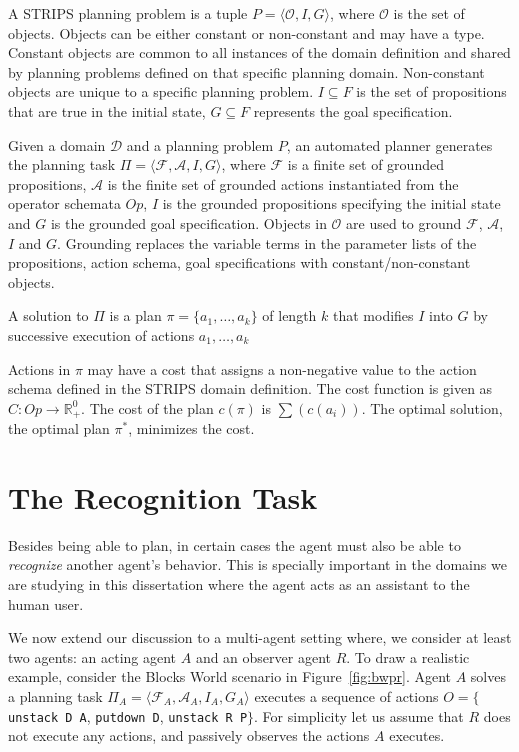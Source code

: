 \begin{definition}
A STRIPS planning problem is a tuple $P = \langle \mathcal{O}, I, G\rangle$, where $\mathcal{O}$ is the set of objects. Objects can be either constant or non-constant and may have a type. Constant objects are common to all instances of the domain definition and shared by planning problems defined on that specific planning domain. Non-constant objects are unique to a specific planning problem. $I \subseteq F$ is the set of propositions that are true in the initial state, $G\subseteq F$ represents the goal specification.
\end{definition}

Given a domain $\mathcal{D}$ and a planning problem $P$, an automated planner generates the planning task $\Pi=\langle \mathcal{F}, \mathcal{A}, I, G\rangle$, where $\mathcal{F}$ is a finite set of grounded propositions, $\mathcal{A}$ is the finite set of grounded actions instantiated from the operator schemata $Op$, $I$ is the grounded propositions specifying the initial state and $G$ is the grounded goal specification. Objects in $\mathcal{O}$ are used to ground $\mathcal{F}$, $\mathcal{A}$, $I$ and $G$. Grounding replaces the variable terms in the parameter lists of the propositions, action schema, goal specifications with constant/non-constant objects. 

\begin{definition}
A solution to $\Pi$ is a plan $\pi=\lbrace a_1, \ldots, a_k\rbrace$ of length $k$ that modifies $I$ into $G$ by successive execution of actions  $a_1, \ldots, a_k$ 
\end{definition}

Actions in $\pi$ may have a cost that assigns a non-negative value to the action schema defined in the STRIPS domain definition. The cost function is given as $C: Op \rightarrow \mathbb{R}^0_+$. The cost of the plan $c(\pi)$ is  $\sum(c(a_i))$. The optimal solution, the optimal plan $\pi^*$, minimizes the cost. 



\section{The Recognition Task}
Besides being able to plan, in certain cases the agent must also be able to \textit{recognize} another agent's behavior. This is specially important in the domains we are studying in this dissertation where the agent acts as an assistant to the human user.

We now extend our discussion to a multi-agent setting where, we consider at least two agents: an  acting agent $A$ and an observer agent $R$. To draw a realistic example, consider the Blocks World scenario in Figure~\ref{fig:bwpr}. Agent $A$ solves a planning task $\Pi_A=\langle \mathcal{F}_A, \mathcal{A}_A, I_A, G_A\rangle$ executes a sequence of actions $O=\lbrace$\texttt{unstack D A}, \texttt{putdown D}, \texttt{unstack R P}$\rbrace$. For simplicity let us assume that $R$ does not execute any actions, and passively observes the actions $A$ executes.

